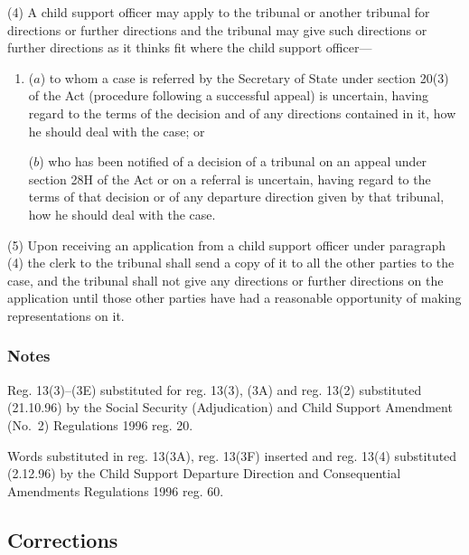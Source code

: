 \documentclass[a4paper]{article}
\newcommand\amendment[1]{\subsubsection*{Notes}{\itshape\frenchspacing\footnotesize #1 \par}}
\begin{document}

(4) A child support officer may apply to the tribunal or another tribunal for directions or further directions and the tribunal may give such directions or further directions as it thinks fit where the child support officer—
\begin{enumerate}\item[]
($a$) to whom a case is referred by the Secretary of State under section 20(3) of the Act (procedure following a successful appeal) is uncertain, having regard to the terms of the decision and of any directions contained in it, how he should deal with the case; or

($b$) who has been notified of a decision of a tribunal on an appeal under section 28H of the Act or on a referral is uncertain, having regard to the terms of that decision or of any departure direction given by that tribunal, how he should deal with the case.
\end{enumerate}

(5) Upon receiving an application from a child support officer under paragraph (4) the clerk to the tribunal shall send a copy of it to all the other parties to the case, and the tribunal shall not give any directions or further directions on the application until those other parties have had a reasonable opportunity of making representations on it.

\amendment{

Reg. 13(3)--(3E) substituted for reg. 13(3), (3A) and reg. 13(2) substituted (21.10.96) by the Social Security (Adjudication) and Child Support Amendment (No.\ 2) Regulations 1996 reg. 20.

Words substituted in reg. 13(3A), reg. 13(3F) inserted and reg. 13(4) substituted (2.12.96) by the Child Support Departure Direction and Consequential Amendments Regulations 1996 reg. 60.
}

\subsection[14. Corrections]{Corrections}
\end{document}
